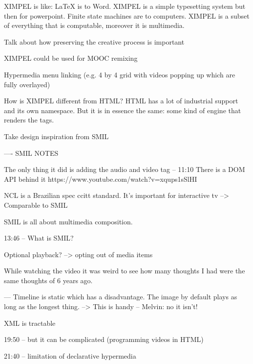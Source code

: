 


XIMPEL is like: LaTeX is to Word. XIMPEL is a simple typesetting system but then for powerpoint.
Finite state machines are to computers. XIMPEL is a subset of everything that is computable, moreover it is multimedia.

Talk about how preserving the creative process is important

XIMPEL could be used for MOOC remixing

Hypermedia menu linking (e.g. 4 by 4 grid with videos popping up which are fully overlayed)


How is XIMPEL different from HTML? HTML has a lot of industrial support and its own namespace. But it is in essence the same: some kind of engine that renders the tags.

Take design inspiration from SMIL

----
SMIL NOTES

The only thing it did is adding the audio and video tag -- 11:10
There is a DOM API behind it
https://www.youtube.com/watch?v=xqups1sSlHI

NCL is a Brazilian spec ccitt standard. It's important for interactive tv
--> Comparable to SMIL

SMIL is all about multimedia composition.

13:46 -- What is SMIL?

Optional playback? --> opting out of media items

While watching the video it was weird to see how many thoughts I had were the same thoughts of 6 years ago.

---
Timeline is static which has a disadvantage.
The image by default plays as long as the longest thing.
--> This is handy -- Melvin: no it isn't!

XML is tractable

19:50 -- but it can be complicated (programming videos in HTML)

21:40 -- limitation of declarative hypermedia

